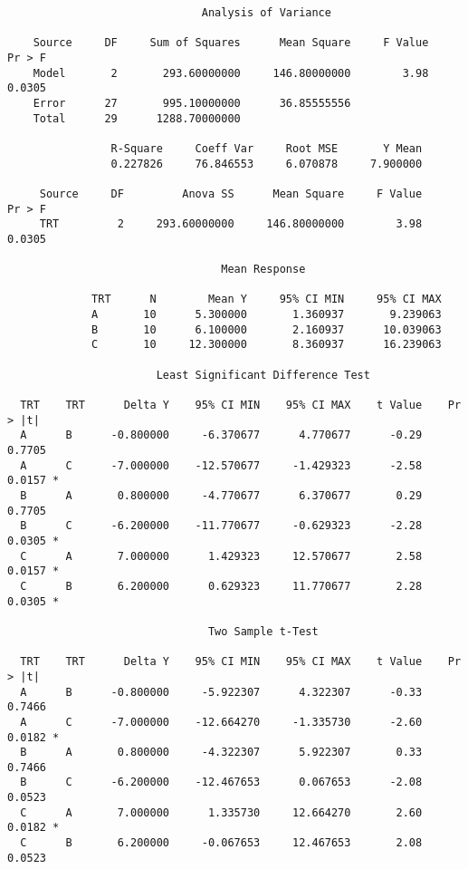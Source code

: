 \documentclass[12pt]{article}
\begin{document}
{\footnotesize\begin{verbatim}
                              Analysis of Variance

    Source     DF     Sum of Squares      Mean Square     F Value     Pr > F
    Model       2       293.60000000     146.80000000        3.98     0.0305
    Error      27       995.10000000      36.85555556                       
    Total      29      1288.70000000                                        

                R-Square     Coeff Var     Root MSE       Y Mean
                0.227826     76.846553     6.070878     7.900000

     Source     DF         Anova SS      Mean Square     F Value     Pr > F
     TRT         2     293.60000000     146.80000000        3.98     0.0305

                                 Mean Response

             TRT      N        Mean Y     95% CI MIN     95% CI MAX
             A       10      5.300000       1.360937       9.239063
             B       10      6.100000       2.160937      10.039063
             C       10     12.300000       8.360937      16.239063

                       Least Significant Difference Test

  TRT    TRT      Delta Y    95% CI MIN    95% CI MAX    t Value    Pr > |t|  
  A      B      -0.800000     -6.370677      4.770677      -0.29      0.7705  
  A      C      -7.000000    -12.570677     -1.429323      -2.58      0.0157 *
  B      A       0.800000     -4.770677      6.370677       0.29      0.7705  
  B      C      -6.200000    -11.770677     -0.629323      -2.28      0.0305 *
  C      A       7.000000      1.429323     12.570677       2.58      0.0157 *
  C      B       6.200000      0.629323     11.770677       2.28      0.0305 *

                               Two Sample t-Test

  TRT    TRT      Delta Y    95% CI MIN    95% CI MAX    t Value    Pr > |t|  
  A      B      -0.800000     -5.922307      4.322307      -0.33      0.7466  
  A      C      -7.000000    -12.664270     -1.335730      -2.60      0.0182 *
  B      A       0.800000     -4.322307      5.922307       0.33      0.7466  
  B      C      -6.200000    -12.467653      0.067653      -2.08      0.0523  
  C      A       7.000000      1.335730     12.664270       2.60      0.0182 *
  C      B       6.200000     -0.067653     12.467653       2.08      0.0523  
\end{verbatim}}
\end{document}
